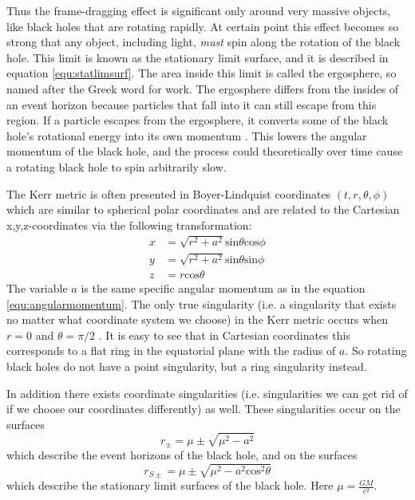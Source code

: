 \documentclass[english, oneside]{HYgradu}
\begin{document}
Thus the frame-dragging effect is significant only around very massive objects, like black holes that are rotating rapidly. At certain point this effect becomes so strong that any object, including light, \textit{must} spin along the rotation of the black hole. This limit is known as the stationary limit surface, and it is described in equation \ref{equ:statlimsurf}. The area inside this limit is called the ergosphere, so named after the Greek word for work. The ergosphere differs from the insides of an event horizon because particles that fall into it can still escape from this region. If a particle escapes from the ergosphere, it converts some of the black hole's rotational energy into its own momentum \citep{grintro}. This lowers the angular momentum of the black hole, and the process could theoretically over time cause a rotating black hole to spin arbitrarily slow.


The Kerr metric is often presented in Boyer-Lindquist coordinates $(t, r, \theta, \phi)$ which are similar to spherical polar coordinates and are related to the Cartesian x,y,z-coordinates via the following transformation:
\begin{align*}
x &= \sqrt{r^2 + a^2} \mathrm{sin}\theta \mathrm{cos}\phi \\
y &= \sqrt{r^2 + a^2} \mathrm{sin}\theta \mathrm{sin}\phi \\
z &= r \mathrm{cos}\theta
\end{align*}
The variable $a$ is the same specific angular momentum as in the equation \ref{equ:angularmomentum}. The only true singularity (i.e. a singularity that exists no matter what coordinate system we choose) in the Kerr metric occurs when $r=0$ and $\theta = \pi/2$ \citep{grintro}. It is easy to see that in Cartesian coordinates this corresponds to a flat ring in the equatorial plane with the radius of $a$. So rotating black holes do not have a point singularity, but a ring singularity instead.

In addition there exists coordinate singularities (i.e. singularities we can get rid of if we choose our coordinates differently) as well. These singularities occur on the surfaces
\begin{equation} \label{equ:evenhorizons}
r_\pm = \mu \pm \sqrt{\mu^2 - a^2}
\end{equation}
which describe the event horizons of the black hole, and on the surfaces
\begin{equation} \label{equ:statlimsurf}
r_{S \pm} = \mu \pm \sqrt{\mu^2 - a^2 \mathrm{cos}^2 \theta}
\end{equation}
which describe the stationary limit surfaces of the black hole. Here $\mu = \frac{GM}{c^2}$. 
\end{document}
